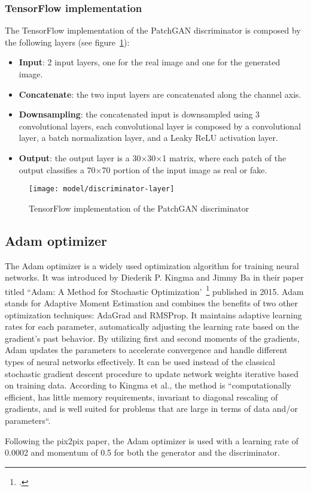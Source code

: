 \subsubsection{TensorFlow implementation}
The TensorFlow implementation of the PatchGAN discriminator is composed by the following layers (see figure~\ref{fig:dis-layer}):
\begin{itemize}
    \item \textbf{Input}: 2 input layers, one for the real image and one for the generated image.
    \item \textbf{Concatenate}: the two input layers are concatenated along the channel axis.
    \item \textbf{Downsampling}: the concatenated input is downsampled using 3 convolutional layers, each convolutional layer is composed by a convolutional layer, a batch normalization layer, and a Leaky ReLU activation layer.
    \item \textbf{Output}: the output layer is a 30$\times$30$\times$1 matrix, where each patch of the output classifies a 70$\times$70 portion of the input image as real or fake.
\end{itemize}
\begin{figure}[H]
    \centering
    \texttt{[image: model/discriminator-layer]}
    \caption{TensorFlow implementation of the PatchGAN discriminator}\label{fig:dis-layer}
\end{figure}
\subsection{Adam optimizer}\label{subsubsec:adam-optimizer}
The Adam optimizer is a widely used optimization algorithm for training neural networks. 
It was introduced by Diederik P. Kingma and Jimmy Ba in their paper titled ``Adam: A Method for Stochastic Optimization'~\footcite{paper:kingma2014adam} published in 2015. 
Adam stands for Adaptive Moment Estimation and combines the benefits of two other optimization techniques: AdaGrad and RMSProp. It maintains adaptive learning rates for each parameter, automatically adjusting the learning rate based on the gradient's past behavior. 
By utilizing first and second moments of the gradients, Adam updates the parameters to accelerate convergence and handle different types of neural networks effectively.
It can be used instead of the classical stochastic gradient descent procedure to update network weights iterative based on training data.
According to Kingma et al., the method is ``computationally efficient, has little memory requirements, invariant to diagonal rescaling of gradients, and is well suited for problems that are large in terms of data and/or parameters``.
\par
Following the pix2pix paper, the Adam optimizer is used with a learning rate of 0.0002 and momentum of 0.5 for both the generator and the discriminator.
